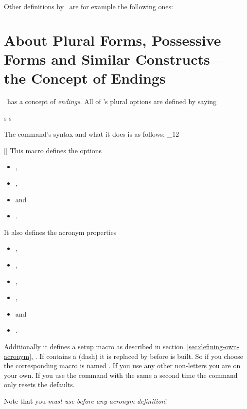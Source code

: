 \documentclass[load-preamble+]{cnltx-doc}
\makeatletter
\renewenvironment{commands}
  {%
    \cnltx@set@catcode_{12}%
    \let\command\cnltx@command
    \cnltxlist
  }
  {\endcnltxlist}
\makeatother
\begin{document}
Other definitions by \acro\ are for example the following ones:

\section{About Plural Forms, Possessive Forms and Similar Constructs -- the
  Concept of Endings}

\acro\ has a concept of \emph{endings}.  All of \acro's plural options are
defined by saying
\begin{sourcecode}
   {s} {s}
\end{sourcecode}
The command's syntax and what it does is as follows:
\begin{commands}
  \command{ProvideAcroEnding}[]
    This macro defines the options
    \begin{itemize}
      \item {},
      \item {},
      \item {} and
      \item {}.
    \end{itemize}
    It also defines the acronym properties
    \begin{itemize}
      \item {},
      \item {},
      \item {},
      \item {},
      \item {} and
      \item {}.
    \end{itemize}
    Additionally it defines a setup macro as
    described in section~\vref{sec:defining-own-acronym},
    .  If  contains a \code{-} (dash) it is
    replaced by \code{\_} before  is built.  So if you
    choose  the corresponding macro is named
    .  If you use any other non-letters you are on your
    own. If you use the command with the same 
    a second time the command only resets the defaults.

    Note that you \emph{must use  before any acronym
      definition}!
\end{commands}
\end{document}
